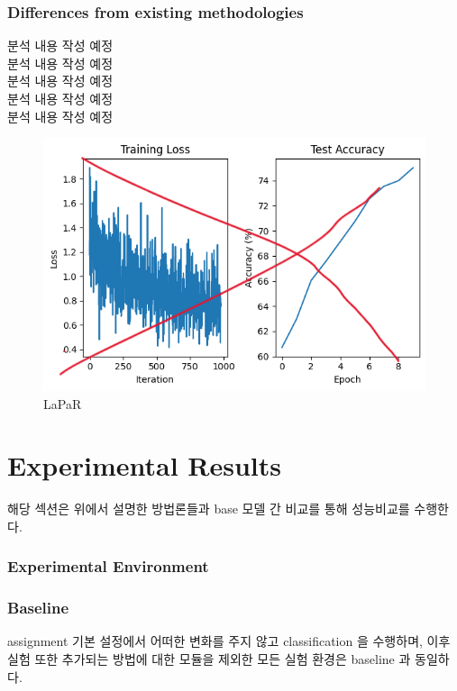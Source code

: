 \subsubsection{Differences from existing methodologies}
분석 내용 작성 예정\\
분석 내용 작성 예정\\
분석 내용 작성 예정\\
분석 내용 작성 예정\\
분석 내용 작성 예정\\

\begin{figure}[h]
  \centering
  \includegraphics[width=\linewidth]{images/temp.png}
  \caption{LaPaR}
  \label{fig:LaPaR1}
\end{figure}


\section{Experimental Results}
해당 섹션은 위에서 설명한 방법론들과 base 모델 간 비교를 통해 성능비교를 수행한다. 

\subsubsection{Experimental Environment}
\subsubsection{Baseline}
assignment 기본 설정에서 어떠한 변화를 주지 않고 classification 을 수행하며, 이후 실험 
또한 추가되는 방법에 대한 모듈을 제외한 모든 실험 환경은 baseline 과 동일하다.

